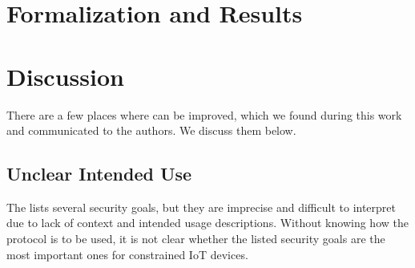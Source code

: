 \documentclass[runningheads, envcountsame, hidelinks, a4paper, draft, x11names]{llncs}
\begin{document}
\section{Formalization and Results}
\label{sec:formalization}


\section{Discussion}
\label{sec:discussion}
There are a few places where \mEdhoc{} can be improved,
which we found during this work and communicated to the authors.
%
We discuss them below. 
%

%

\subsection{Unclear Intended Use}
\label{sec:unclearProtocolUse}
%
The \mEdhoc{} \mSpec{} lists several security goals, but they are
imprecise and difficult to interpret due to lack of context and intended usage
descriptions.
%
Without knowing how the protocol is to be used,
it is not clear whether the listed security goals are the most important ones
for constrained IoT devices.
%
\end{document}
